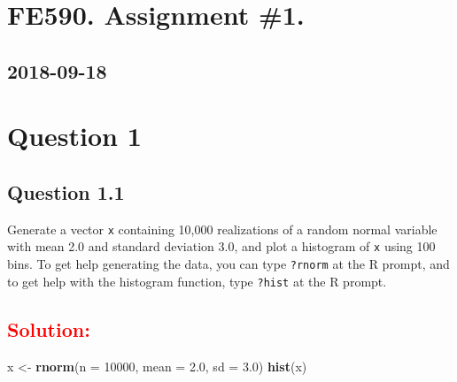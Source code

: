 \documentclass[]{article}
\title{}
\author{}
\date{}
\newenvironment{Shaded}{\begin{snugshade}}{\end{snugshade}}
\newcommand{\KeywordTok}[1]{\textcolor[rgb]{0.13,0.29,0.53}{\textbf{#1}}}
\newcommand{\DataTypeTok}[1]{\textcolor[rgb]{0.13,0.29,0.53}{#1}}
\newcommand{\DecValTok}[1]{\textcolor[rgb]{0.00,0.00,0.81}{#1}}
\newcommand{\FloatTok}[1]{\textcolor[rgb]{0.00,0.00,0.81}{#1}}
\newcommand{\StringTok}[1]{\textcolor[rgb]{0.31,0.60,0.02}{#1}}
\newcommand{\CommentTok}[1]{\textcolor[rgb]{0.56,0.35,0.01}{\textit{#1}}}
\newcommand{\OperatorTok}[1]{\textcolor[rgb]{0.81,0.36,0.00}{\textbf{#1}}}
\newcommand{\NormalTok}[1]{#1}
\begin{document}
\section{FE590. Assignment \#1.}\label{fe590.-assignment-1.}

\subsection{2018-09-18}\label{section}

\section{Question 1}\label{question-1}

\subsection{Question 1.1}\label{question-1.1}

\begin{Shaded}
\end{Shaded}

Generate a vector \texttt{x} containing 10,000 realizations of a random
normal variable with mean 2.0 and standard deviation 3.0, and plot a
histogram of \texttt{x} using 100 bins. To get help generating the data,
you can type \texttt{?rnorm} at the R prompt, and to get help with the
histogram function, type \texttt{?hist} at the R prompt.

\subsection{\texorpdfstring{\textcolor{red}{Solution:}}{}}\label{section-1}

\begin{Shaded}
\begin{Highlighting}[]
\NormalTok{x <-}\StringTok{ }\KeywordTok{rnorm}\NormalTok{(}\DataTypeTok{n =} \DecValTok{10000}\NormalTok{, }\DataTypeTok{mean =} \FloatTok{2.0}\NormalTok{, }\DataTypeTok{sd =} \FloatTok{3.0}\NormalTok{)}
\KeywordTok{hist}\NormalTok{(x)}
\end{Highlighting}
\end{Shaded}
\end{document}
